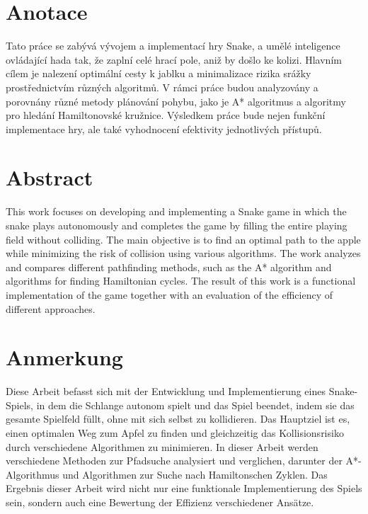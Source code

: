 \thispagestyle{empty}
\setcounter{page}{0}

\section*{Anotace}
Tato práce se zabývá vývojem a implementací hry Snake, a umělé inteligence ovládající hada tak, že zaplní celé hrací pole, aniž by došlo ke kolizi. Hlavním cílem je nalezení optimální cesty k jablku a minimalizace rizika srážky prostřednictvím různých algoritmů. V rámci práce budou analyzovány a porovnány různé metody plánování pohybu, jako je A* algoritmus a algoritmy pro hledání Hamiltonovské kružnice. Výsledkem práce bude nejen funkční implementace hry, ale také vyhodnocení efektivity jednotlivých přístupů.

\section*{Abstract}
This work focuses on developing and implementing a Snake game in which the snake plays autonomously and completes the game by filling the entire playing field without colliding. The main objective is to find an optimal path to the apple while minimizing the risk of collision using various algorithms. The work analyzes and compares different pathfinding methods, such as the A* algorithm and algorithms for finding Hamiltonian cycles. The result of this work is a functional implementation of the game together with an evaluation of the efficiency of different approaches.

\section*{Anmerkung}
Diese Arbeit befasst sich mit der Entwicklung und Implementierung eines Snake-Spiels, in dem die Schlange autonom spielt und das Spiel beendet, indem sie das gesamte Spielfeld füllt, ohne mit sich selbst zu kollidieren. Das Hauptziel ist es, einen optimalen Weg zum Apfel zu finden und gleichzeitig das Kollisionsrisiko durch verschiedene Algorithmen zu minimieren. In dieser Arbeit werden verschiedene Methoden zur Pfadsuche analysiert und verglichen, darunter der A*-Algorithmus und Algorithmen zur Suche nach Hamiltonschen Zyklen. Das Ergebnis dieser Arbeit wird nicht nur eine funktionale Implementierung des Spiels sein, sondern auch eine Bewertung der Effizienz verschiedener Ansätze.
